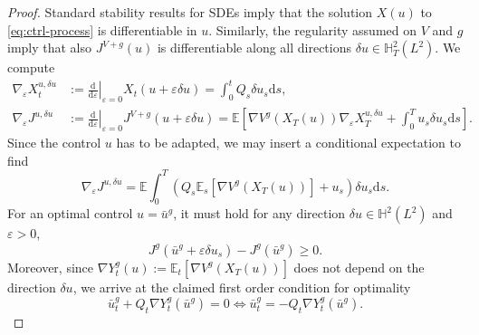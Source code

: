 \documentclass[11pt, a4paper]{scrartcl}
\numberwithin{equation}{section}
\theoremstyle{plain}
\theoremstyle{remark}
\newcommand{\assign}{:=}
\newcommand{\mathd}{\mathrm{d}}
\begin{document}
\begin{proof}
  Standard stability results for SDEs imply that the solution $X (u)$ to
  \eqref{eq:ctrl-process} is differentiable in $u$. Similarly, the regularity
  assumed on $V$ and $g$ imply that also $J^{V + g} (u)$ is differentiable
  along all directions $\delta u \in \mathbb{H}^2_T (L^2)$. We compute
  \begin{align*}
      \nabla_{\varepsilon} X_t^{u, \delta u} & \assign \left.
      \frac{\mathd}{\mathd \varepsilon} \right|_{\varepsilon = 0} X_t (u +
      \varepsilon \delta u) = \int_0^t Q_s \delta u_s \mathd s,\\
      \nabla_{\varepsilon} J^{u, \delta u} & \assign \left.
      \frac{\mathd}{\mathd \varepsilon} \right|_{\varepsilon = 0} J^{V + g}
      (u + \varepsilon \delta u) =\mathbb{E} \left[ \nabla V^g (X_T (u))
      \nabla_{\varepsilon} X^{u, \delta u}_T + \int_0^T u_s \delta u_s \mathd
      s \right].
  \end{align*}
  Since the control $u$ has to be adapted, we may insert a conditional
  expectation to find
  \begin{equation}
    \nabla_{\varepsilon} J^{u, \delta u}
      = \mathbb{E} \int_0^T (Q_s \mathbb{E}_s [\nabla V^g (X_T (u))] + u_s)
      \delta u_s \mathd s. \label{eq:EL-der}
  \end{equation}
  For an optimal control $u = \bar{u}^g$, it must hold for any direction
  $\delta u \in \mathbb{H}^2 (L^2)$ and $\varepsilon > 0$,
  \[ J^g (\bar{u}^g + \varepsilon \delta u_s) - J^g (\bar{u}^g) \geqslant 0.
  \]
  Moreover, since $\nabla Y_t^g (u) \assign \mathbb{E}_t [\nabla V^g (X_T
  (u))]$ does not depend on the direction $\delta u$, we arrive at the claimed
  first order condition for optimality
  \[ \bar{u}^g_t + Q_t \nabla Y^g_t (\bar{u}^g) = 0 \Leftrightarrow
     \bar{u}^g_t = - Q_t \nabla Y_t^g (\bar{u}^g) . \]
\end{proof}
\end{document}
